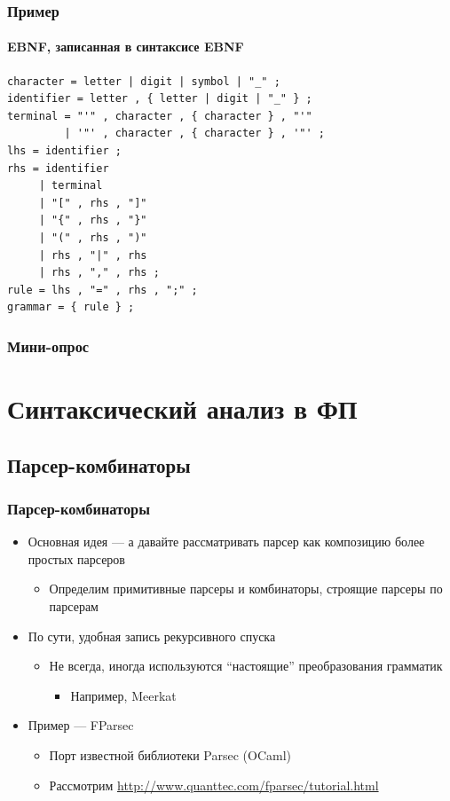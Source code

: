 \documentclass[xetex,mathserif,serif]{beamer}
\begin{document}
    \begin{frame}[fragile]
        \frametitle{Пример}
        \framesubtitle{EBNF, записанная в синтаксисе EBNF}
        \begin{footnotesize}
            \begin{verbatim}
character = letter | digit | symbol | "_" ;
identifier = letter , { letter | digit | "_" } ;
terminal = "'" , character , { character } , "'" 
         | '"' , character , { character } , '"' ;
lhs = identifier ;
rhs = identifier
     | terminal
     | "[" , rhs , "]"
     | "{" , rhs , "}"
     | "(" , rhs , ")"
     | rhs , "|" , rhs
     | rhs , "," , rhs ;
rule = lhs , "=" , rhs , ";" ;
grammar = { rule } ;
            \end{verbatim}
        \end{footnotesize}
    \end{frame}

    \begin{frame}
        \frametitle{Мини-опрос}
    \end{frame}

    \section{Синтаксический анализ в ФП}

    \subsection{Парсер-комбинаторы}

    \begin{frame}
        \frametitle{Парсер-комбинаторы}
        \begin{itemize}
            \item Основная идея --- а давайте рассматривать парсер как композицию более простых парсеров
            \begin{itemize}
                \item Определим примитивные парсеры и комбинаторы, строящие парсеры по парсерам
            \end{itemize}
            \item По сути, удобная запись рекурсивного спуска
            \begin{itemize}
                \item Не всегда, иногда используются ``настоящие'' преобразования грамматик
                \begin{itemize}
                    \item Например, Meerkat
                \end{itemize}
            \end{itemize}
            \item Пример --- FParsec
            \begin{itemize}
                \item Порт известной библиотеки Parsec (OCaml)
                \item Рассмотрим \url{http://www.quanttec.com/fparsec/tutorial.html}
            \end{itemize}
        \end{itemize}
    \end{frame}
\end{document}
